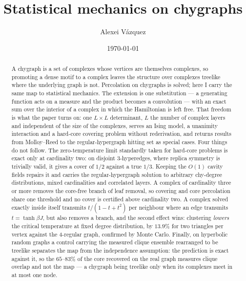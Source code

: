\documentclass[aps,pre,twocolumn,superscriptaddress,floatfix]{revtex4-2}
\begin{document}
\title{Statistical mechanics on chygraphs}

\author{Alexei V\'azquez}

\date{\today}

\begin{abstract}
A chygraph is a set of complexes whose vertices are themselves complexes, so
promoting a dense motif to a complex leaves the structure over complexes
treelike where the underlying graph is not. Percolation on chygraphs is solved;
here I carry the same map to statistical mechanics. The extension is one
substitution --- a generating function acts on a measure and the product becomes
a convolution --- with an exact sum over the interior of a complex in which the
Hamiltonian is left free. That freedom is what the paper turns on: one
$L\times L$ determinant, $L$ the number of complex layers and independent of the
size of the complexes, serves an Ising model, a unanimity interaction and a
hard-core covering problem without rederivation, and returns results from
Molloy--Reed to the regular-hypergraph hitting set as special cases. Four things
do not follow. The zero-temperature limit standardly taken
for hard-core problems is exact only at cardinality two: on disjoint
$3$-hyperedges, where replica symmetry is trivially valid, it gives a cover of
$1/2$ against a true $1/3$. Keeping the $O(1)$ cavity fields repairs it and
carries the regular-hypergraph solution to arbitrary chy-degree distributions,
mixed cardinalities and correlated layers. A complex of cardinality three or
more removes the core-free branch of leaf removal, so covering and core
percolation share one threshold and no cover is certified above cardinality two.
A complex solved exactly inside itself transmits $t/(1-t+t^{2})$ per neighbour
where an edge transmits $t=\tanh\beta J$, but also removes a branch, and the
second effect wins: clustering \emph{lowers} the critical temperature at fixed
degree distribution, by $13.9\%$ for two triangles per vertex against the
$4$-regular graph, confirmed by Monte Carlo. Finally, on hyperbolic random graphs a
control carrying the measured clique ensemble rearranged to be treelike
separates the map from the independence assumption: the prediction is exact
against it, so the $65$--$83\%$ of the core recovered on the real graph measures
clique overlap and not the map --- a chygraph being treelike only when its
complexes meet in at most one node.
\end{abstract}
\end{document}
